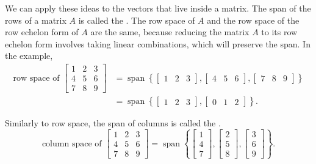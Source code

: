 We can apply these ideas to the vectors that live inside a matrix. The span of the rows of a matrix $A$ is called the \emph{}.
The row space of $A$ and the row space of the row echelon form of $A$ are the same, because reducing the matrix $A$ to its row echelon form involves taking linear combinations, which will preserve the span.
In the example,
\begin{equation*}
\begin{split}
\text{row space of }
\begin{bmatrix}
1 & 2 & 3 \\
4 & 5 & 6 \\
7 & 8 & 9
\end{bmatrix}
& =
\operatorname{span}
\left\{
\begin{bmatrix}
1 & 2 & 3
\end{bmatrix}
,
\begin{bmatrix}
4 & 5 & 6
\end{bmatrix}
,
\begin{bmatrix}
7 & 8 & 9
\end{bmatrix}
\right\}
\\
& =
\operatorname{span}
\left\{
\begin{bmatrix}
1 & 2 & 3
\end{bmatrix}
,
\begin{bmatrix}
0 & 1 & 2
\end{bmatrix}
\right\} .
\end{split}
\end{equation*}

\medskip

Similarly to row space, the span of columns is called the
\emph{}.
\begin{equation*}
\text{column space of }
\begin{bmatrix}
1 & 2 & 3 \\
4 & 5 & 6 \\
7 & 8 & 9
\end{bmatrix}
=
\operatorname{span}
\left\{
\begin{bmatrix}
1 \\ 4 \\ 7
\end{bmatrix}
,
\begin{bmatrix}
2 \\ 5 \\ 8
\end{bmatrix}
,
\begin{bmatrix}
3 \\ 6 \\ 9
\end{bmatrix}
\right\} .
\end{equation*}

